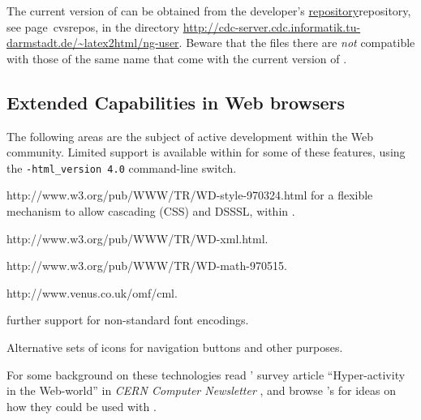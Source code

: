 \medskip\noindent
The current version of \latextohtmlNG{} can be obtained from
the developer's \hyperref[page]{repository}{repository, see page~}{}{cvsrepos},
in the directory
\url{http://cdc-server.cdc.informatik.tu-darmstadt.de/~latex2html/ng-user}.
Beware that the files there are \emph{not} compatible with those of the
same name that come with the current version of \latextohtml.



\subsection*{Extended Capabilities in Web browsers}
The following areas are the subject of active development
within the Web community. 
Limited support is available within \latextohtml{} for some of these features,
using the \texttt{-html\_version 4.0} command-line switch.
\begin{description}
%
%
%
\item [style-sheets: ] %
{http://www.w3.org/pub/WWW/TR/WD-style-970324.html}
for a flexible mechanism to allow cascading (CSS) and DSSSL, 
within .
%
%
%
\item [XML: ] %
{http://www.w3.org/pub/WWW/TR/WD-xml.html}.

%
%
\item [MathML: ] %
{http://www.w3.org/pub/WWW/TR/WD-math-970515}.

%
%
\item [CML: ] %
{http://www.venus.co.uk/omf/cml}.

%
\item [Fonts: ] further support for non-standard font encodings.

%
\item [Icons: ] Alternative sets of icons for navigation buttons 
and other purposes.
\end{description}
For some background on these technologies read
\Goossens' survey article ``Hyper-activity in the Web-world''
in \textsl{CERN Computer Newsletter} 
,
and browse \AxelRamge's 
for ideas on how they could be used with \latextohtml.



\endinput















